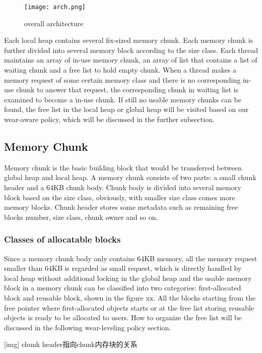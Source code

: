 \documentclass{vldb}
\begin{document}
\begin{figure}
\centering
\texttt{[image: arch.png]}
\caption{overall architecture}
\label{fig:arch}
\end{figure}

Each local heap contains several fix-sized memory chunk.
Each memory chunk is further divided into several memory block according to the size class.
Each thread maintains an array of in-use memory chunk, an array of list that contains a list of waiting chunk and a free list to hold empty chunk.
When a thread makes a memory request of some certain memory class and there is no corresponding in-use chunk to answer that request,
the corresponding chunk in waiting list is examined to become a in-use chunk. 
If still no usable memory chunks can be found,
the free list in the local heap or global heap will be visited based on our wear-aware policy,
which will be discussed in the further subsection.

\subsection{Memory Chunk}

Memory chunk is the basic building block that would be transferred between global heap and local heap. 
A memory chunk consists of two parts: a small chunk header and a 64KB chunk body. 
Chunk body is divided into several memory block based on the size class,
obviously, with smaller size class comes more memory blocks. 
Chunk header stores some metadata such as remaining free blocks number, size class, chunk owner and so on.

\subsubsection{Classes of allocatable blocks}
Since a memory chunk body only contains 64KB memory, all the memory request smaller than 64KB is regarded as small request,
which is directly handled by local heap without additional locking in the global heap and 
the usable memory block in a memory chunk can be classified into two categories: first-allocated block and reusable block,
shown in the figure xx. 
All the blocks starting from the free pointer where first-allocated objects starts or at the free list storing reusable objects is ready to be allocated to users. How to organize the free list will be discussed in the following wear-leveling policy section.

[img] chunk header指向chunk内存块的关系
\end{document}
